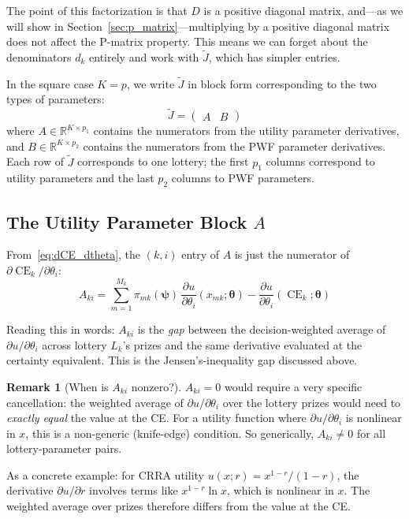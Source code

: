 \documentclass[11pt,a4paper]{article}
\theoremstyle{definition}
\newtheorem{remark}[theorem]{Remark}
\newcommand{\R}{\mathbb{R}}
\newcommand{\btheta}{\boldsymbol{\theta}}
\newcommand{\bpsi}{\boldsymbol{\psi}}
\DeclareMathOperator{\CE}{CE}
\begin{document}
The point of this factorization is that $D$ is a positive diagonal matrix,
and---as we will show in Section~\ref{sec:p_matrix}---multiplying by a
positive diagonal matrix does not affect the P-matrix property. This means
we can forget about the denominators $d_k$ entirely and work with
$\widetilde{J}$, which has simpler entries.

In the square case $K = p$, we write $\widetilde{J}$ in block form
corresponding to the two types of parameters:
\begin{equation}
    \label{eq:J_tilde_block}
    \widetilde{J} = \begin{pmatrix} A & B \end{pmatrix}
\end{equation}
where $A \in \R^{K \times p_1}$ contains the numerators from the utility
parameter derivatives, and $B \in \R^{K \times p_2}$ contains the numerators
from the PWF parameter derivatives. Each row of $\widetilde{J}$ corresponds to
one lottery; the first $p_1$ columns correspond to utility parameters and the
last $p_2$ columns to PWF parameters.

\subsection{The Utility Parameter Block $A$}

From~\eqref{eq:dCE_dtheta}, the $(k, i)$ entry of $A$ is just the numerator
of $\partial \CE_k / \partial \theta_i$:
\begin{equation}
    \label{eq:A_entry}
    A_{ki} = \sum_{m=1}^{M_k} \pi_{mk}(\bpsi) \,
    \frac{\partial u}{\partial \theta_i}(x_{mk}; \btheta)
    - \frac{\partial u}{\partial \theta_i}(\CE_k; \btheta)
\end{equation}

Reading this in words: $A_{ki}$ is the \emph{gap} between the
decision-weighted average of $\partial u / \partial \theta_i$ across lottery
$L_k$'s prizes and the same derivative evaluated at the certainty equivalent.
This is the Jensen's-inequality gap discussed above.

\begin{remark}[When is $A_{ki}$ nonzero?]
\label{rem:A_interp}
$A_{ki} = 0$ would require a very specific cancellation: the weighted average
of $\partial u / \partial \theta_i$ over the lottery prizes would need to
\emph{exactly equal} the value at the CE. For a utility function where
$\partial u / \partial \theta_i$ is nonlinear in $x$, this is a non-generic
(knife-edge) condition. So generically, $A_{ki} \neq 0$ for all
lottery-parameter pairs.

As a concrete example: for CRRA utility $u(x; r) = x^{1-r}/(1-r)$, the
derivative $\partial u / \partial r$ involves terms like $x^{1-r} \ln x$,
which is nonlinear in $x$. The weighted average over prizes therefore
differs from the value at the CE.
\end{remark}
\end{document}
